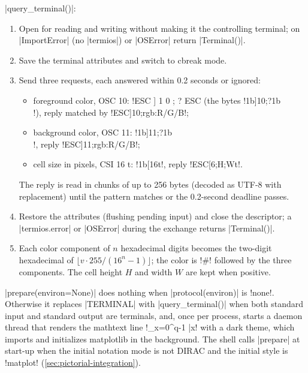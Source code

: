 {\begin{algorithm}\label{alg:pictorial-query}
\py|query_terminal()|:
\begin{enumerate}
  \item Open  for reading and writing without making it the controlling
    terminal; on \py|ImportError| (no \py|termios|) or \py|OSError| return \py|Terminal()|.
  \item Save the terminal attributes and switch to cbreak mode.
  \item Send three requests, each answered within 0.2 seconds or ignored:
    \begin{itemize}
      \item foreground color, OSC 10: \code!ESC ] 1 0 ; ? ESC \! (the bytes
        \code!\x1b]10;?\x1b\\!), reply matched by \code!ESC]10;rgb:R/G/B!;
      \item background color, OSC 11: \code!\x1b]11;?\x1b\\!, reply
        \code!ESC]11;rgb:R/G/B!;
      \item cell size in pixels, CSI 16 t: \code!\x1b[16t!, reply \code!ESC[6;H;Wt!.
    \end{itemize}
    The reply is read in chunks of up to 256 bytes (decoded as UTF-8 with replacement) until the
    pattern matches or the 0.2-second deadline passes.
  \item Restore the attributes (flushing pending input) and close the descriptor; a
    \py|termios.error| or \py|OSError| during the exchange returns \py|Terminal()|.
  \item Each color component of $n$ hexadecimal digits becomes the two-digit hexadecimal of
    $\lfloor v\cdot255/(16^n-1)\rfloor$; the color is \code!#! followed by the three
    components. The cell height $H$ and width $W$ are kept when positive.
\end{enumerate}
\end{algorithm}

\py|prepare(environ=None)| does nothing when \py|protocol(environ)| is \code!none!. Otherwise it
replaces \py|TERMINAL| with \py|query_terminal()| when both standard input and standard output
are terminals, and, once per process, starts a daemon thread that renders the mathtext line
\code!\sum_{x=0}^{q-1} |x\rangle! with a dark theme, which imports and initializes matplotlib
in the background. The shell calls \py|prepare| at start-up when the initial notation mode is not
DIRAC and the initial style is \code!matplot! (\cref{sec:pictorial-integration}).

}
